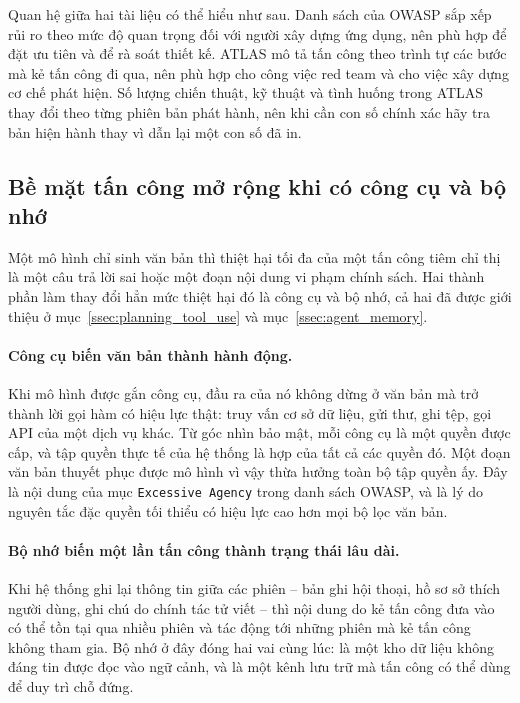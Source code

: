 Quan hệ giữa hai tài liệu có thể hiểu như sau. Danh sách của OWASP sắp xếp rủi ro theo mức độ quan trọng đối với người xây dựng ứng dụng, nên phù hợp để đặt ưu tiên và để rà soát thiết kế. ATLAS mô tả tấn công theo trình tự các bước mà kẻ tấn công đi qua, nên phù hợp cho công việc red team và cho việc xây dựng cơ chế phát hiện. Số lượng chiến thuật, kỹ thuật và tình huống trong ATLAS thay đổi theo từng phiên bản phát hành, nên khi cần con số chính xác hãy tra bản hiện hành thay vì dẫn lại một con số đã in.

\subsection{Bề mặt tấn công mở rộng khi có công cụ và bộ nhớ}
\label{ssec:surface_tools_memory}

Một mô hình chỉ sinh văn bản thì thiệt hại tối đa của một tấn công tiêm chỉ thị là một câu trả lời sai hoặc một đoạn nội dung vi phạm chính sách. Hai thành phần làm thay đổi hẳn mức thiệt hại đó là công cụ và bộ nhớ, cả hai đã được giới thiệu ở mục~\ref{ssec:planning_tool_use} và mục~\ref{ssec:agent_memory}.

\paragraph{Công cụ biến văn bản thành hành động.} Khi mô hình được gắn công cụ, đầu ra của nó không dừng ở văn bản mà trở thành lời gọi hàm có hiệu lực thật: truy vấn cơ sở dữ liệu, gửi thư, ghi tệp, gọi API của một dịch vụ khác. Từ góc nhìn bảo mật, mỗi công cụ là một quyền được cấp, và tập quyền thực tế của hệ thống là hợp của tất cả các quyền đó. Một đoạn văn bản thuyết phục được mô hình vì vậy thừa hưởng toàn bộ tập quyền ấy. Đây là nội dung của mục \texttt{Excessive Agency} trong danh sách OWASP, và là lý do nguyên tắc đặc quyền tối thiểu có hiệu lực cao hơn mọi bộ lọc văn bản.

\paragraph{Bộ nhớ biến một lần tấn công thành trạng thái lâu dài.} Khi hệ thống ghi lại thông tin giữa các phiên -- bản ghi hội thoại, hồ sơ sở thích người dùng, ghi chú do chính tác tử viết -- thì nội dung do kẻ tấn công đưa vào có thể tồn tại qua nhiều phiên và tác động tới những phiên mà kẻ tấn công không tham gia. Bộ nhớ ở đây đóng hai vai cùng lúc: là một kho dữ liệu không đáng tin được đọc vào ngữ cảnh, và là một kênh lưu trữ mà tấn công có thể dùng để duy trì chỗ đứng.

